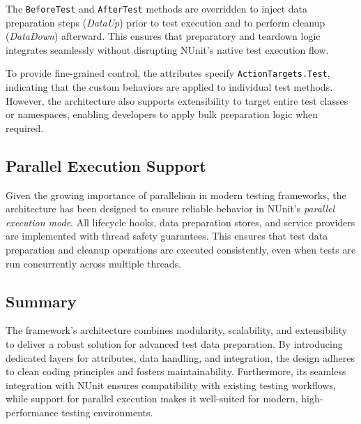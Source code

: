 The \texttt{BeforeTest} and \texttt{AfterTest} methods are overridden to inject data preparation steps (\textit{DataUp}) prior to test execution and to perform cleanup (\textit{DataDown}) afterward. This ensures that preparatory and teardown logic integrates seamlessly without disrupting NUnit’s native test execution flow.

To provide fine-grained control, the attributes specify \texttt{ActionTargets.Test}, indicating that the custom behaviors are applied to individual test methods. However, the architecture also supports extensibility to target entire test classes or namespaces, enabling developers to apply bulk preparation logic when required.

\subsection{Parallel Execution Support}
Given the growing importance of parallelism in modern testing frameworks, the architecture has been designed to ensure reliable behavior in NUnit's \textit{parallel execution mode}. All lifecycle hooks, data preparation stores, and service providers are implemented with thread safety guarantees. This ensures that test data preparation and cleanup operations are executed consistently, even when tests are run concurrently across multiple threads.

\subsection{Summary}
The framework's architecture combines modularity, scalability, and extensibility to deliver a robust solution for advanced test data preparation. By introducing dedicated layers for attributes, data handling, and integration, the design adheres to clean coding principles and fosters maintainability. Furthermore, its seamless integration with NUnit ensures compatibility with existing testing workflows, while support for parallel execution makes it well-suited for modern, high-performance testing environments.
